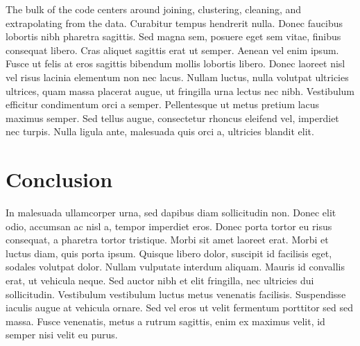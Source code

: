 \documentclass{article}
\begin{document}
The bulk of the code centers around joining, clustering, cleaning, and extrapolating from the data. 
Curabitur tempus hendrerit nulla. Donec faucibus lobortis nibh pharetra sagittis. Sed magna sem, posuere eget sem vitae, finibus consequat libero. Cras aliquet sagittis erat ut semper. Aenean vel enim ipsum. Fusce ut felis at eros sagittis bibendum mollis lobortis libero. Donec laoreet nisl vel risus lacinia elementum non nec lacus. Nullam luctus, nulla volutpat ultricies ultrices, quam massa placerat augue, ut fringilla urna lectus nec nibh. Vestibulum efficitur condimentum orci a semper. Pellentesque ut metus pretium lacus maximus semper. Sed tellus augue, consectetur rhoncus eleifend vel, imperdiet nec turpis. Nulla ligula ante, malesuada quis orci a, ultricies blandit elit.
	

\section{Conclusion}

In malesuada ullamcorper urna, sed dapibus diam sollicitudin non. Donec elit odio, accumsan ac nisl a, tempor imperdiet eros. Donec porta tortor eu risus consequat, a pharetra tortor tristique. Morbi sit amet laoreet erat. Morbi et luctus diam, quis porta ipsum. Quisque libero dolor, suscipit id facilisis eget, sodales volutpat dolor. Nullam vulputate interdum aliquam. Mauris id convallis erat, ut vehicula neque. Sed auctor nibh et elit fringilla, nec ultricies dui sollicitudin. Vestibulum vestibulum luctus metus venenatis facilisis. Suspendisse iaculis augue at vehicula ornare. Sed vel eros ut velit fermentum porttitor sed sed massa. Fusce venenatis, metus a rutrum sagittis, enim ex maximus velit, id semper nisi velit eu purus.
\end{document}
